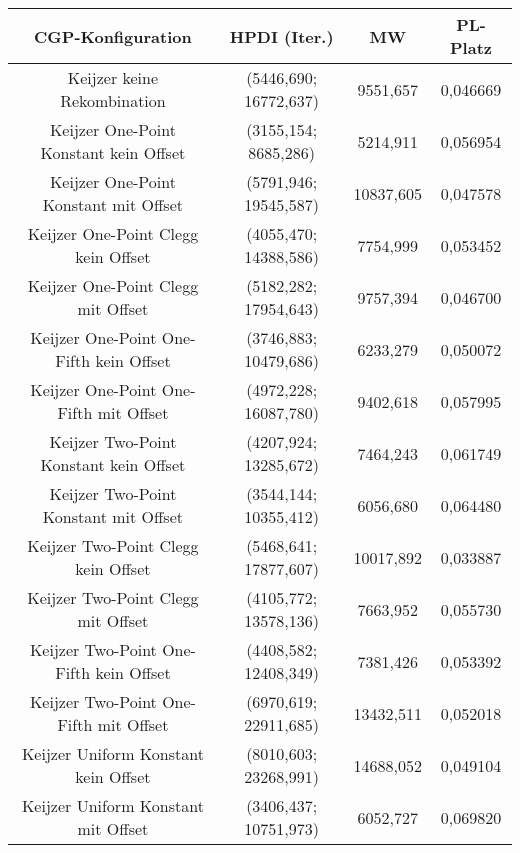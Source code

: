 \begin{table}[H]
	\centering
	\begin{tabular}{c | c | c | c}
		\textbf{CGP-Konfiguration} & \textbf{HPDI (Iter.)} & \textbf{MW} & \textbf{PL-Platz}\\
		\hline
		Keijzer keine Rekombination & (5446,690; 16772,637) & 9551,657 & 0,046669\\
		\hline
		\hline
		Keijzer One-Point Konstant kein Offset & \color{Green}(3155,154; 8685,286)\color{black} & \color{Green}5214,911\color{black} & 0,056954\\
		\hline
		Keijzer One-Point Konstant mit Offset & (5791,946; 19545,587) & 10837,605 & 0,047578\\
		\hline
		Keijzer One-Point Clegg kein Offset & (4055,470; 14388,586) & 7754,999 & 0,053452\\
		\hline
		Keijzer One-Point Clegg mit Offset & (5182,282; 17954,643) & 9757,394 & 0,046700\\
		\hline
		Keijzer One-Point One-Fifth kein Offset & \color{Green}(3746,883; 10479,686)\color{black} & 6233,279 & 0,050072\\
		\hline
		Keijzer One-Point One-Fifth mit Offset & (4972,228; 16087,780) & 9402,618 & 0,057995\\
		\hline
		\hline
		Keijzer Two-Point Konstant kein Offset & (4207,924; 13285,672) & 7464,243 & 0,061749\\
		\hline
		Keijzer Two-Point Konstant mit Offset & \color{Green}(3544,144; 10355,412)\color{black} & \color{Green}6056,680\color{black} & \color{Green}0,064480\color{black}\\
		\hline
		Keijzer Two-Point Clegg kein Offset & (5468,641; 17877,607) & 10017,892 & \color{red}0,033887\color{black}\\
		\hline
		Keijzer Two-Point Clegg mit Offset & (4105,772; 13578,136) & 7663,952 & 0,055730\\
		\hline
		Keijzer Two-Point One-Fifth kein Offset & (4408,582; 12408,349) & 7381,426 & 0,053392\\
		\hline
		Keijzer Two-Point One-Fifth mit Offset & \color{red}(6970,619; 22911,685)\color{black} & \color{red}13432,511\color{black} & 0,052018\\
		\hline
		\hline
		Keijzer Uniform Konstant kein Offset & \color{red}(8010,603; 23268,991)\color{black} & \color{red}14688,052\color{black} & 0,049104\\
		\hline
		Keijzer Uniform Konstant mit Offset & (3406,437; 10751,973) & \color{Green}6052,727\color{black} & \color{Green}0,069820\color{black}\\

\end{tabular}
\end{table}

